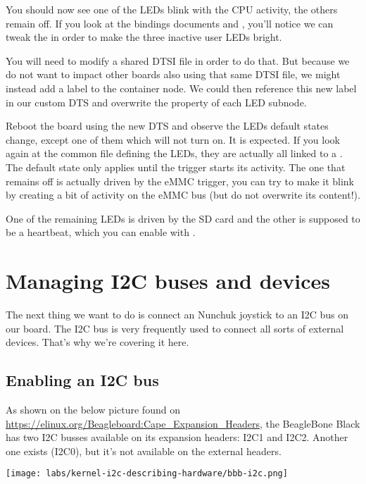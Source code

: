 You should now see one of the LEDs blink with the CPU activity, the
others remain off. If you look at the bindings documents
 and
, you'll
notice we can tweak the  in order to make the
three inactive user LEDs bright.

You will need to modify a shared DTSI file in order to do that. But
because we do not want to impact other boards also using that same DTSI
file, we might instead add a label to the  container node. We
could then reference this new label in our custom DTS and overwrite the
 property of each LED subnode.

Reboot the board using the new DTS and observe the LEDs default states
change, except one of them which will not turn on. It is expected. If
you look again at the common file defining the LEDs, they are actually
all linked to a . The default state only
applies until the trigger starts its activity. The one that remains off
is actually driven by the eMMC trigger, you can try to make it blink by
creating a bit of activity on the eMMC bus (but do not overwrite its
content!).

One of the remaining LEDs is driven by the SD card and the other is
supposed to be a heartbeat, which you can enable with
.

\section{Managing I2C buses and devices}

The next thing we want to do is connect an Nunchuk joystick
to an I2C bus on our board. The I2C bus is very frequently used
to connect all sorts of external devices. That's why we're covering
it here.

\subsection{Enabling an I2C bus}

As shown on the below picture found on
\url{https://elinux.org/Beagleboard:Cape_Expansion_Headers}, the
BeagleBone Black has two I2C busses available on its expansion headers:
I2C1 and I2C2. Another one exists (I2C0), but it's not
available on the external headers.

\texttt{[image: labs/kernel-i2c-describing-hardware/bbb-i2c.png]}

